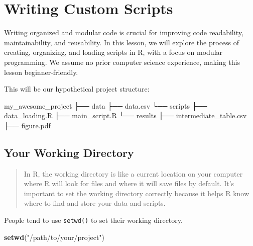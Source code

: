 \documentclass[
]{book}
\newenvironment{Shaded}{\begin{snugshade}}{\end{snugshade}}
\newcommand{\ExtensionTok}[1]{#1}
\newcommand{\FunctionTok}[1]{\textcolor[rgb]{0.13,0.29,0.53}{\textbf{#1}}}
\newcommand{\NormalTok}[1]{#1}
\newcommand{\StringTok}[1]{\textcolor[rgb]{0.31,0.60,0.02}{#1}}
\begin{document}
\hypertarget{writing-custom-scripts}{%
\section{Writing Custom Scripts}\label{writing-custom-scripts}}

Writing organized and modular code is crucial for improving code readability, maintainability, and reusability. In this lesson, we will explore the process of creating, organizing, and loading scripts in R, with a focus on modular programming. We assume no prior computer science experience, making this lesson beginner-friendly.

This will be our hypothetical project structure:

\begin{Shaded}
\begin{Highlighting}[]
\ExtensionTok{my\_awesome\_project}
\ExtensionTok{├──}\NormalTok{ data}
    \ExtensionTok{├──}\NormalTok{ data.csv}
\ExtensionTok{└──}\NormalTok{ scripts}
    \ExtensionTok{├──}\NormalTok{ data\_loading.R}
    \ExtensionTok{├──}\NormalTok{ main\_script.R}
\ExtensionTok{└──}\NormalTok{ results}
    \ExtensionTok{├──}\NormalTok{ intermediate\_table.csv}
    \ExtensionTok{├──}\NormalTok{ figure.pdf}
\end{Highlighting}
\end{Shaded}

\hypertarget{your-working-directory}{%
\subsection{Your Working Directory}\label{your-working-directory}}

\begin{quote}
In R, the working directory is like a current location on your computer where R will look for files and where it will save files by default. It's important to set the working directory correctly because it helps R know where to find and store your data and scripts.
\end{quote}

People tend to use \texttt{setwd()} to set their working directory.

\begin{Shaded}
\begin{Highlighting}[]
\FunctionTok{setwd}\NormalTok{(}\StringTok{"/path/to/your/project"}\NormalTok{)}
\end{Highlighting}
\end{Shaded}
\end{document}
